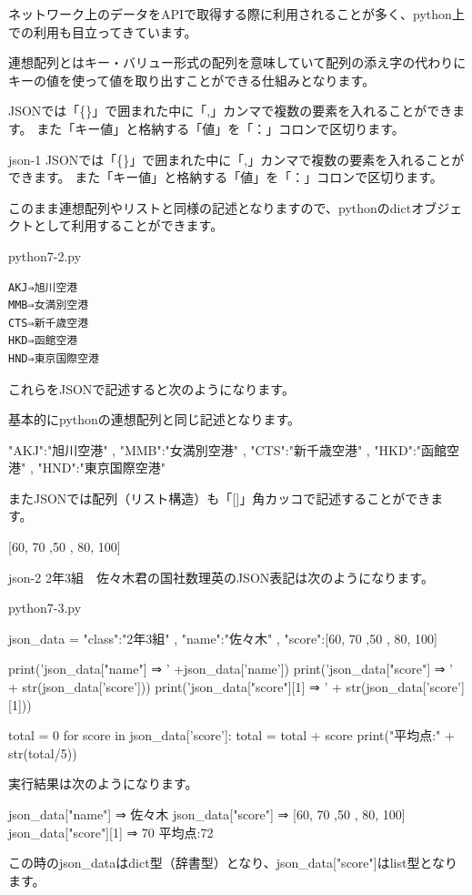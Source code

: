 \documentclass[11pt,a4paper,dvipdfmx,titlepage]{jsreport}
\begin{document}
ネットワーク上のデータをAPIで取得する際に利用されることが多く、python上での利用も目立ってきています。

連想配列とはキー・バリュー形式の配列を意味していて配列の添え字の代わりにキーの値を使って値を取り出すことができる仕組みとなります。

JSONでは「\{\}」で囲まれた中に「,」カンマで複数の要素を入れることができます。
また「キー値」と格納する「値」を「：」コロンで区切ります。

\begin{pabox}{json-1}
JSONでは「\{\}」で囲まれた中に「,」カンマで複数の要素を入れることができます。
また「キー値」と格納する「値」を「：」コロンで区切ります。

このまま連想配列やリストと同様の記述となりますので、pythonのdictオブジェクトとして利用することができます。
\begin{codebox}{python7-2.py}
\begin{verbatim}
AKJ⇒旭川空港
MMB⇒女満別空港
CTS⇒新千歳空港
HKD⇒函館空港
HND⇒東京国際空港   
\end{verbatim}
これらをJSONで記述すると次のようになります。

基本的にpythonの連想配列と同じ記述となります。
\begin{listing}{1}
{
 "AKJ":"旭川空港" ,
 "MMB":"女満別空港" , 
 "CTS":"新千歳空港" ,
 "HKD":"函館空港" ,
 "HND":"東京国際空港"
}
\end{listing}

\end{codebox}
\end{pabox}
またJSONでは配列（リスト構造）も「[]」角カッコで記述することができます。

[60, 70 ,50 , 80, 100]

\begin{pabox}{json-2}
2年3組　佐々木君の国社数理英のJSON表記は次のようになります。
\begin{codebox}{python7-3.py}
\begin{listing}{1}
json_data = {
  "class":"2年3組" ,
  "name":"佐々木" ,
  "score":[60, 70 ,50 , 80, 100]
  }
  
print('json_data["name"] ⇒ ' +json_data['name'])
print('json_data["score"] ⇒ ' + str(json_data['score']))
print('json_data["score"][1] ⇒ ' + str(json_data['score'][1]))

total = 0
for score in json_data['score']:
	total = total + score
print("平均点:" + str(total/5)) 
\end{listing}

実行結果は次のようになります。
\begin{listing}{1}
json_data["name"] ⇒ 佐々木
json_data["score"] ⇒ [60, 70 ,50 , 80, 100]
json_data["score"][1] ⇒ 70
平均点:72
\end{listing}

\end{codebox}
\end{pabox}
この時のjson\_dataはdict型（辞書型）となり、json\_data["score"]はlist型となります。
\end{document}

